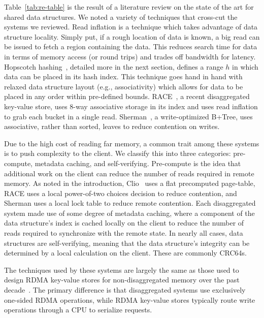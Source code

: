 \documentclass[12pt]{ucsddissertation}
\begin{document}
\begin{table}[h]
		
		\label{tab:re-table}
	\end{table} 

Table~\ref{tab:re-table} is the result of a literature review on the state of the art for shared
data structures. We noted a variety of techniques that cross-cut the systems we reviewed. Read
inflation is a technique which takes advantage of data structure locality. Simply put, if a rough
location of data is known, a big read can be issued to fetch a region containing the data. This
reduces search time for data in terms of memory access (or round trips) and trades off bandwidth for
latency. Hopscotch hashing~\cite{hopscotch}, detailed more in the next section, defines a range $h$
in which data can be placed in its hash index. This technique goes hand in hand with relaxed data
structure layout (e.g., associativity) which allows for data to be placed in any order within
pre-defined bounds. RACE~\cite{race}, a recent disaggregated key-value store, uses 8-way associative
storage in its index and uses read inflation to grab each bucket in a single read.
Sherman~\cite{sherman}, a write-optimized B+Tree, uses associative, rather than sorted, leaves to
reduce contention on writes.

Due to the high cost of reading far memory, a common trait among these systems is to push complexity
to the client. We classify this into three categories: pre-compute, metadata caching, and
self-verifying. Pre-compute is the idea that additional work on the client can reduce the number of
reads required in remote memory. As noted in the introduction, Clio~\cite{clio} uses a flat
precomputed page-table, RACE uses a local power-of-two choices decision to reduce contention, and
Sherman uses a local lock table to reduce remote contention. Each disaggregated system made use of
some degree of metadata caching, where a component of the data structure's index is cached locally
on the client to reduce the number of reads required to synchronize with the remote state. In nearly
all cases, data structures are self-verifying, meaning that the data structure's integrity can be
determined by a local calculation on the client. These are commonly CRC64s.

The techniques used by these systems are largely the same as those used to design RDMA key-value
stores for non-disaggregated memory over the past decade~\cite{pilaf,cell,herd,farm}. The primary
difference is that disaggregated systems use exclusively one-sided RDMA operations, while RDMA
key-value stores typically route write operations through a CPU to serialize requests.
\end{document}
